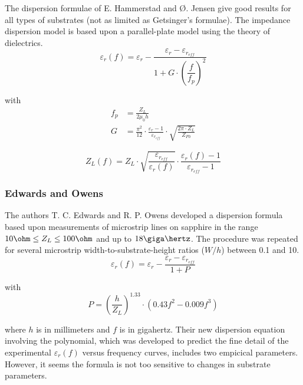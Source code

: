 \documentclass[10pt]{report}
\begin{document}
The dispersion formulae of E. Hammerstad and {\O}. Jensen
\cite{Hammerstad} give good results for all types of substrates (not
as limited as Getsinger's formulae).  The impedance dispersion model
is based upon a parallel-plate model using the theory of dielectrics.
\begin{equation}
\varepsilon_{r}(f) = \varepsilon_{r} - \frac{\varepsilon_{r} - \varepsilon_{r_{eff}}}{1 + G\cdot \left(\dfrac{f}{f_{p}}\right)^{2}}
\end{equation}

with
\begin{align}
f_{p} &= \frac{Z_{L}}{2\mu_{0} h}\\
G &= \frac{\pi^{2}}{12}\cdot\frac{\varepsilon_{r} - 1}{\varepsilon_{r_{eff}}}\cdot\sqrt{\frac{2\pi\cdot Z_{L}}{Z_{F0}}}
\end{align}

\begin{equation}
Z_{L}(f) = Z_{L}\cdot\sqrt{\frac{\varepsilon_{r_{eff}}}{\varepsilon_{r}(f)}}\cdot\frac{\varepsilon_{r}(f) - 1}{\varepsilon_{r_{eff}} - 1}
\end{equation}

\subsubsection{Edwards and Owens}

The authors T. C. Edwards and R. P. Owens \cite{Edwards2} developed a
dispersion formula based upon measurements of microstrip lines on
sapphire in the range $10\ohm \le Z_L \le 100\ohm$ and up to
$18\giga\hertz$.  The procedure was repeated for several microstrip
width-to-substrate-height ratios ($W/h$) between 0.1 and 10.
\begin{equation}
\varepsilon_{r}(f) = \varepsilon_{r} - \dfrac{\varepsilon_{r} - \varepsilon_{r_{eff}}}{1 + P}
\end{equation}

with
\begin{equation}
P = \left(\dfrac{h}{Z_{L}}\right)^{1.33}\cdot\left(0.43 f^2 - 0.009 f^3\right)
\end{equation}

where $h$ is in millimeters and $f$ is in gigahertz.  Their new
dispersion equation involving the polynomial, which was developed to
predict the fine detail of the experimental $\varepsilon_{r}(f)$
versus frequency curves, includes two empicical parameters.  However,
it seems the formula is not too sensitive to changes in substrate
parameters.
\end{document}
